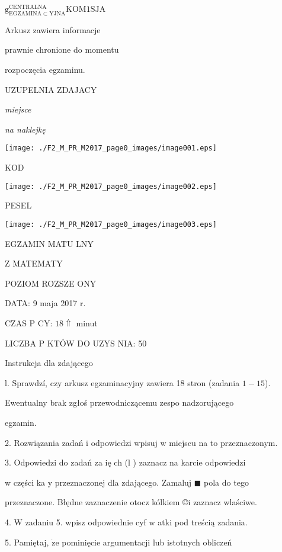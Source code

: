 \documentclass[a4paper,12pt]{article}
\begin{document}
$\mathrm{g}_{\mathrm{E}\mathrm{G}\mathrm{Z}\mathrm{A}\mathrm{M}\mathrm{I}\mathrm{N}\mathrm{A}\subset \mathrm{Y}\mathrm{J}\mathrm{N}\mathrm{A}}^{\mathrm{C}\mathrm{E}\mathrm{N}\mathrm{T}\mathrm{R}\mathrm{A}\mathrm{L}\mathrm{N}\mathrm{A}}\mathrm{K}\mathrm{O}\mathrm{M}1\mathrm{S}\mathrm{J}\mathrm{A}$

Arkusz zawiera informacje

prawnie chronione do momentu

rozpoczęcia egzaminu.

UZUPELNIA ZDAJACY

{\it miejsce}

{\it na naklejkę}
\begin{center}
\texttt{[image: ./F2\_M\_PR\_M2017\_page0\_images/image001.eps]}
\end{center}
KOD
\begin{center}
\texttt{[image: ./F2\_M\_PR\_M2017\_page0\_images/image002.eps]}
\end{center}
PESEL
\begin{center}
\texttt{[image: ./F2\_M\_PR\_M2017\_page0\_images/image003.eps]}
\end{center}
EGZAMIN MATU  LNY

Z MATEMATY

POZIOM ROZSZE  ONY

DATA: 9 maja 2017 $\mathrm{r}.$

CZAS P CY: $ 18\Uparrow$ minut

LICZBA P KTÓW DO UZYS NIA: 50

Instrukcja dla zdającego

l. Sprawdzí, czy arkusz egzaminacyjny zawiera 18 stron (zadania $1-15$).

Ewentualny brak zgłoś przewodniczącemu zespo nadzorującego

egzamin.

2. Rozwiązania zadań i odpowiedzi wpisuj w miejscu na to przeznaczonym.

3. Odpowiedzi do zadań za ię ch (l ) zaznacz na karcie odpowiedzi

w części ka $\mathrm{y}$ przeznaczonej dla zdającego. Zamaluj $\blacksquare$ pola do tego

przeznaczone. Błędne zaznaczenie otocz kólkiem \copyright i zaznacz wlaściwe.

4. $\mathrm{W}$ zadaniu 5. wpisz odpowiednie cyf w atki pod treścią zadania.

5. Pamiętaj, $\dot{\mathrm{z}}\mathrm{e}$ pominięcie argumentacji lub istotnych obliczeń
\end{document}
